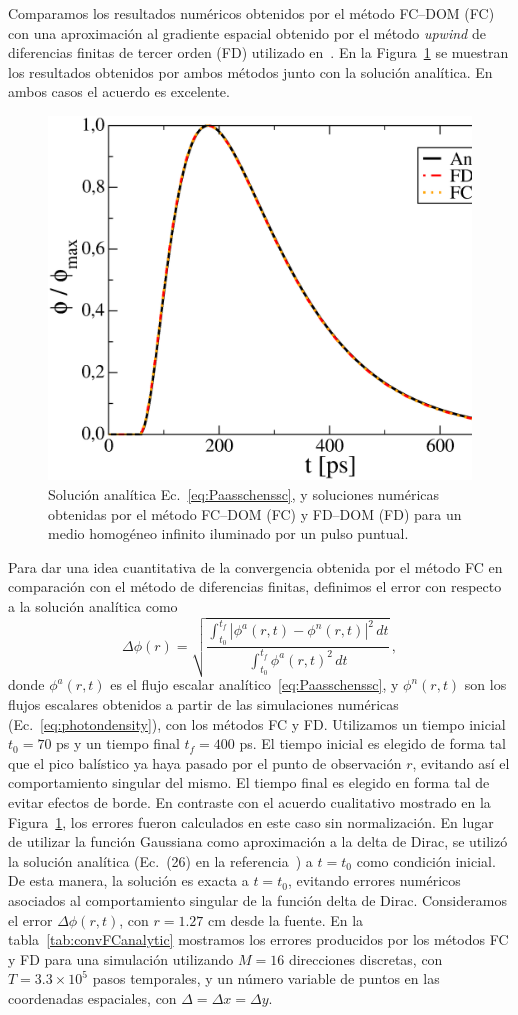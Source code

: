Comparamos los resultados numéricos obtenidos por el método FC--DOM (FC)
con una aproximación al gradiente espacial obtenido por el método {\em upwind} 
de diferencias finitas de tercer orden (FD) utilizado en~\cite{Fujii2014}. 
En la Figura~\ref{fig:analytic1} se muestran los resultados obtenidos por ambos métodos 
junto con la solución analítica. En ambos casos el acuerdo es excelente.

 \begin{figure}[h]
\centering
  \includegraphics[width=0.48\linewidth]{figuras/analytic1.eps}
  \caption{Solución analítica Ec.~\eqref{eq:Paasschenssc}, 
  y soluciones numéricas obtenidas por el método FC--DOM (FC) 
  y FD--DOM (FD) para un medio homogéneo infinito iluminado 
  por un pulso puntual.}
 \label{fig:analytic1}
\end{figure}
 
Para dar una idea cuantitativa de la convergencia obtenida por el método 
FC en comparación con el método de diferencias finitas, 
definimos el error con respecto a la solución analítica como
\begin{equation}
\Delta \phi(r)= 
\sqrt{
\frac{ \int_{t_0}^{t_f} |\phi^a(r,t)-\phi^n(r,t)|^2 \,  dt}
{\int_{t_0}^{t_f} \phi^a(r,t)^2 \, dt } 
} \, , 
\end{equation}
donde $\phi^a(r,t)$ es el flujo escalar analítico~\eqref{eq:Paasschenssc}, 
y $\phi^n(r,t)$ son los flujos escalares obtenidos a partir de las 
simulaciones numéricas (Ec.~\eqref{eq:photondensity}), con los métodos FC y FD. 
Utilizamos un tiempo inicial $t_0=70$ ps y un tiempo final 
$t_f=400$ ps. El tiempo inicial es elegido de forma tal que el pico balístico 
ya haya pasado por el punto de observación $r$, evitando así el comportamiento 
singular del mismo. El tiempo final es elegido en forma tal 
de evitar efectos de borde. En contraste con el acuerdo 
cualitativo mostrado en la Figura~\ref{fig:analytic1}, 
los errores fueron calculados en este caso sin normalización. 
En lugar de utilizar la función Gaussiana como aproximación a la delta de Dirac, 
se utilizó la solución analítica (Ec.~(26) en la referencia~\cite{Paasschens1997}) 
a $t=t_0$ como condición inicial. 
De esta manera, la solución es exacta a $t=t_0$, 
evitando errores numéricos asociados al comportamiento singular de la función 
delta de Dirac. 
Consideramos el error $\Delta \phi (r,t)$, con $r=1.27$ cm desde la fuente. 
En la tabla~\ref{tab:convFCanalytic} mostramos los errores producidos por los métodos FC y FD 
para una simulación utilizando $M=16$ direcciones discretas, con $T=3.3\times 10^5$ 
pasos temporales, y un número variable de puntos en las coordenadas espaciales, 
con $\Delta =\Delta x =\Delta y$.

